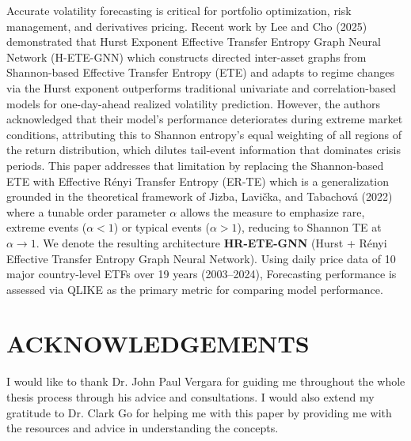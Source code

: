 \documentclass[12pt,oneside]{report}
\newcommand{\frontchapter}[1]{%
  \chapter*{#1}\addcontentsline{toc}{chapter}{#1}}
\begin{document}
Accurate volatility forecasting is critical for portfolio optimization,
risk management, and derivatives pricing. Recent work by Lee and Cho
(2025) demonstrated that Hurst Exponent Effective Transfer Entropy Graph
Neural Network (H-ETE-GNN) which constructs directed inter-asset graphs
from Shannon-based Effective Transfer Entropy (ETE) and adapts to regime
changes via the Hurst exponent outperforms traditional univariate and
correlation-based models for one-day-ahead realized volatility
prediction. However, the authors acknowledged that their model's
performance deteriorates during extreme market conditions, attributing
this to Shannon entropy's equal weighting of all regions of the return
distribution, which dilutes tail-event information that dominates crisis
periods. This paper addresses that limitation by replacing the
Shannon-based ETE with Effective Rényi Transfer Entropy (ER-TE) which is
a generalization grounded in the theoretical framework of Jizba,
Lavička, and Tabachová (2022) where a tunable order parameter $\alpha$
allows the measure to emphasize rare, extreme events ($\alpha < 1$) or
typical events ($\alpha > 1$), reducing to Shannon TE at
$\alpha \to 1$. We denote the resulting architecture
\textbf{HR-ETE-GNN} (Hurst + Rényi Effective Transfer Entropy Graph
Neural Network). Using daily price data of 10 major country-level ETFs
over 19 years (2003--2024), Forecasting performance is assessed via
QLIKE as the primary metric for comparing model performance.

\frontchapter{ACKNOWLEDGEMENTS}

I would like to thank Dr. John Paul Vergara for guiding me throughout
the whole thesis process through his advice and consultations. I would
also extend my gratitude to Dr. Clark Go for helping me with this paper
by providing me with the resources and advice in understanding the
concepts.

\begingroup
\singlespacing
\tableofcontents
\clearpage
{}
\listoffigures
\clearpage
{}
\listoftables
\endgroup

\clearpage
{}

\end{document}
